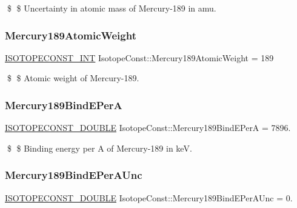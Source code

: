 \$ \$ Uncertainty in atomic mass of Mercury-\/189 in amu. \mbox{\label{group___isotope_const-_mercury-_hg189_ga20d96a49716131b8970b28be4552f17a}} 
\subsubsection{\texorpdfstring{Mercury189\+Atomic\+Weight}{Mercury189AtomicWeight}}
{\footnotesize\ttfamily \mbox{\hyperlink{group___isotope_const-_macros_ga5f18360b3e99483a35c32d789e62621c}{I\+S\+O\+T\+O\+P\+E\+C\+O\+N\+S\+T\+\_\+\+I\+NT}} Isotope\+Const\+::\+Mercury189\+Atomic\+Weight = 189}

\$ \$ Atomic weight of Mercury-\/189. \mbox{\label{group___isotope_const-_mercury-_hg189_ga50ef141c9a3d0a48232e2dacb9fd3bf9}} 
\subsubsection{\texorpdfstring{Mercury189\+Bind\+E\+PerA}{Mercury189BindEPerA}}
{\footnotesize\ttfamily \mbox{\hyperlink{group___isotope_const-_macros_ga8f45a7272ce02c0b4c65c44636ed719a}{I\+S\+O\+T\+O\+P\+E\+C\+O\+N\+S\+T\+\_\+\+D\+O\+U\+B\+LE}} Isotope\+Const\+::\+Mercury189\+Bind\+E\+PerA = 7896.}

\$ \$ Binding energy per A of Mercury-\/189 in keV. \mbox{\label{group___isotope_const-_mercury-_hg189_gaccac87871380fd4d49477e5f6b1f06fd}} 
\subsubsection{\texorpdfstring{Mercury189\+Bind\+E\+Per\+A\+Unc}{Mercury189BindEPerAUnc}}
{\footnotesize\ttfamily \mbox{\hyperlink{group___isotope_const-_macros_ga8f45a7272ce02c0b4c65c44636ed719a}{I\+S\+O\+T\+O\+P\+E\+C\+O\+N\+S\+T\+\_\+\+D\+O\+U\+B\+LE}} Isotope\+Const\+::\+Mercury189\+Bind\+E\+Per\+A\+Unc = 0.}

